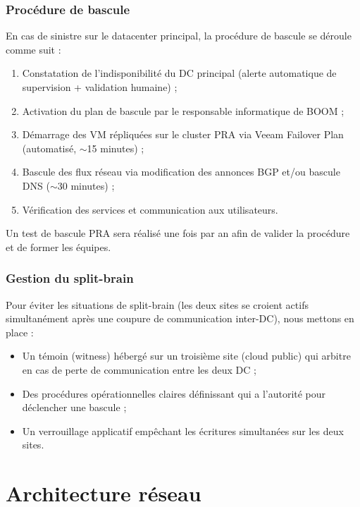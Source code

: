 \documentclass[12pt,a4paper]{report}
\begin{document}
\subsection{Procédure de bascule}

En cas de sinistre sur le datacenter principal, la procédure de bascule se déroule comme suit :

\begin{enumerate}
\item Constatation de l'indisponibilité du DC principal (alerte automatique de supervision + validation humaine) ;
\item Activation du plan de bascule par le responsable informatique de BOOM ;
\item Démarrage des VM répliquées sur le cluster PRA via Veeam Failover Plan (automatisé, $\sim$15 minutes) ;
\item Bascule des flux réseau via modification des annonces BGP et/ou bascule DNS ($\sim$30 minutes) ;
\item Vérification des services et communication aux utilisateurs.
\end{enumerate}

Un test de bascule PRA sera réalisé une fois par an afin de valider la procédure et de former les équipes.

\subsection{Gestion du split-brain}

Pour éviter les situations de split-brain (les deux sites se croient actifs simultanément après une coupure de communication inter-DC), nous mettons en place :

\begin{itemize}
\item Un témoin (witness) hébergé sur un troisième site (cloud public) qui arbitre en cas de perte de communication entre les deux DC ;
\item Des procédures opérationnelles claires définissant qui a l'autorité pour déclencher une bascule ;
\item Un verrouillage applicatif empêchant les écritures simultanées sur les deux sites.
\end{itemize}


\chapter{Architecture réseau}
\end{document}
